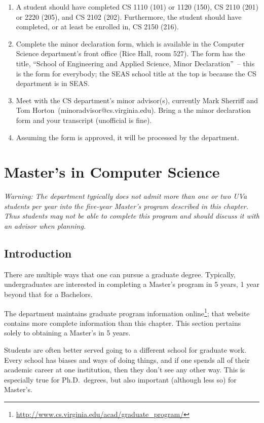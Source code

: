 \documentclass[10pt,letter]{book}
\makeatletter
\newenvironment{numlist}{
\begin{enumerate}
\setlength{\itemsep}{0pt}
\setlength{\parskip}{0pt}}
{\end{enumerate}}
\newcommand{\csminoradvisor}{Mark Sherriff and Tom Horton}
\newcommand{\csminoradvisoremail}{minoradvisor@cs.virginia.edu}
\newcommand{\mychapter}[2]{\chapter{#1}\renewcommand{\leftmark}{\textsc{#2}}}
\newcommand{\mysection}[1]{\section{#1}\renewcommand{\rightmark}{#1}}
\newcommand{\myurl}[1]{\footnote{\scriptsize\url{#1}}}
\makeatother
\begin{document}
\begin{numlist}

\item A student should have completed CS 1110 (101) or 1120 (150), CS
  2110 (201) or 2220 (205), and CS 2102 (202). Furthermore, the
  student should have completed, or at least be enrolled in, CS 2150
  (216).

\item Complete the minor declaration form, which is available in the
  Computer Science department's front office (Rice Hall, room 527).
  The form has the title, ``School of Engineering and Applied Science,
  Minor Declaration''~-- this is the form for everybody; the SEAS
  school title at the top is because the CS department is in SEAS.

\item Meet with the CS department's minor advisor(s), currently
  \csminoradvisor\ (\csminoradvisoremail).  Bring a the minor
  declaration form and your transcript (unofficial is fine).

\item Assuming the form is approved, it will be processed by the
  department.

\end{numlist}


\clearpage
\mychapter{Master's in Computer Science}{Masters in CS}


{\Large\em Warning: The department typically does not admit more than
  one or two UVa students per year into the five-year Master's program
  described in this chapter. Thus students may not be able to complete
  this program and should discuss it with an advisor when planning.}

\mysection{Introduction}

There are multiple ways that one can pursue a graduate degree.
Typically, undergraduates are interested in completing a Master's
program in 5 years, 1 year beyond that for a Bachelors.

The department maintains graduate program information
online\myurl{http://www.cs.virginia.edu/acad/graduate_program/};
that website contains more complete information than this chapter.
This section pertains solely to obtaining a Master's in 5 years.

Students are often better served going to a different school for
graduate work.  Every school has biases and ways of doing things, and
if one spends all of their academic career at one institution, then
they don't see any other way.  This is especially true for
Ph.D.\ degrees, but also important (although less so) for Master's.
\end{document}
